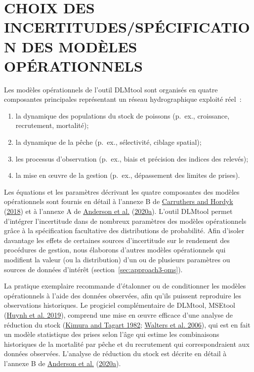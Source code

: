 \documentclass[11pt]{book}
\begin{document}
\frontmatter

\hypertarget{sec:om}{%
\section{CHOIX DES INCERTITUDES/SPÉCIFICATION DES MODÈLES OPÉRATIONNELS}\label{sec:om}}

Les modèles opérationnels de l'outil DLMtool sont organisés en quatre composantes principales représentant un réseau hydrographique exploité réel~:
\begin{enumerate}
\def\labelenumi{\arabic{enumi}.}

\item
  la dynamique des populations du stock de poissons (p.~ex., croissance, recrutement, mortalité);
\item
  la dynamique de la pêche (p.~ex., sélectivité, ciblage spatial);
\item
  les processus d'observation (p.~ex., biais et précision des indices des relevés);
\item
  la mise en œuvre de la gestion (p.~ex., dépassement des limites de prises).
\end{enumerate}
Les équations et les paramètres décrivant les quatre composantes des modèles opérationnels sont fournis en détail à l'annexe B de \protect\hyperlink{ref-carruthers2018}{Carruthers and Hordyk} (\protect\hyperlink{ref-carruthers2018}{2018}) et à l'annexe A de \protect\hyperlink{ref-anderson2020gfmp}{Anderson et al.} (\protect\hyperlink{ref-anderson2020gfmp}{2020a}). L'outil DLMtool permet d'intégrer l'incertitude dans de nombreux paramètres des modèles opérationnels grâce à la spécification facultative des distributions de probabilité. Afin d'isoler davantage les effets de certaines sources d'incertitude sur le rendement des procédures de gestion, nous élaborons d'autres modèles opérationnels qui modifient la valeur (ou la distribution) d'un ou de plusieurs paramètres ou sources de données d'intérêt (section~\ref{sec:approach3-oms}).

La pratique exemplaire recommande d'étalonner ou de conditionner les modèles opérationnels à l'aide des données observées, afin qu'ils puissent reproduire les observations historiques. Le progiciel complémentaire de DLMtool, MSEtool (\protect\hyperlink{ref-huynh_msetool_2019}{Huynh et al. 2019}), comprend une mise en œuvre efficace d'une analyse de réduction du stock (\protect\hyperlink{ref-kimura1982}{Kimura and Tagart 1982}; \protect\hyperlink{ref-walters2006}{Walters et al. 2006}), qui est en fait un modèle statistique des prises selon l'âge qui estime les combinaisons historiques de la mortalité par pêche et du recrutement qui correspondraient aux données observées. L'analyse de réduction du stock est décrite en détail à l'annexe B de \protect\hyperlink{ref-anderson2020gfmp}{Anderson et al.} (\protect\hyperlink{ref-anderson2020gfmp}{2020a}).
\end{document}
